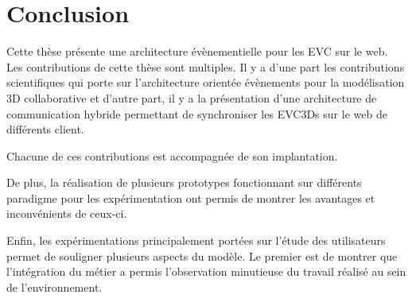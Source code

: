 \chapter{Conclusion}
\chaptertable

Cette thèse présente une architecture évènementielle pour les \gls{EVC} sur le 
web. Les contributions de cette thèse sont multiples. Il y a d'une part les 
contributions scientifiques qui porte sur l'architecture orientée évènements pour la 
modélisation 3D collaborative et d'autre part, il y a la présentation d'une 
architecture de communication hybride permettant de synchroniser les 
\glspl{EVC3D} sur le web de différents client.

Chacune de ces contributions est accompagnée de son implantation. 

De plus, la réalisation de plusieurs prototypes fonctionnant sur différents 
paradigme pour les expérimentation ont permis de montrer les avantages et 
inconvénients de ceux-ci.

Enfin, les expérimentations principalement portées sur l'étude des utilisateurs 
permet de souligner plusieurs aspects du modèle. Le premier est de montrer que 
l'intégration du métier a permis l'observation minutieuse du travail réalisé au sein 
de l'environnement. 